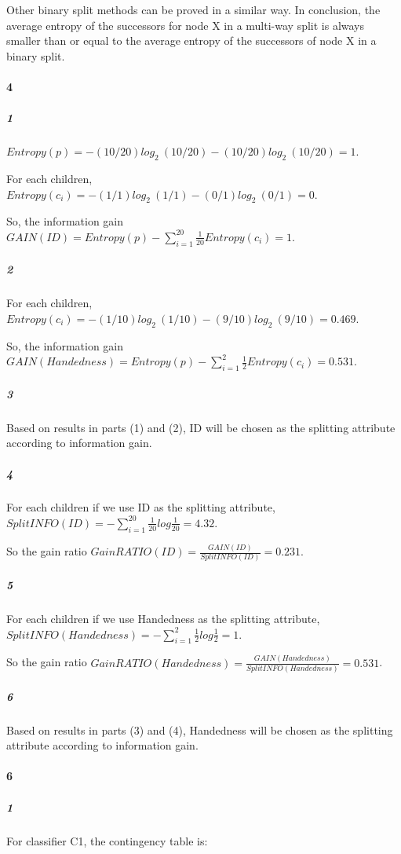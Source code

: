 \documentclass[22pt]{article}
\begin{document}
		Other binary split methods can be proved in a similar way. In conclusion,  the average entropy of the successors for node X in a multi-way split is always smaller than or equal to the average entropy of the successors of node X in a binary split. 

	\paragraph{4}
		\subparagraph{1} $Entropy(p) = - (10/20)log_2\ (10/20) -  (10/20)log_2\ (10/20) = 1$.

		For each children, $Entropy(c_i) = - (1/1)log_2\ (1/1) - (0/1)log_2\ (0/1) = 0$.

		So, the information gain $GAIN(ID) = Entropy(p) - \sum\limits_{i=1}^ {20}\frac{1}{20}Entropy(c_i) = 1$.

		\subparagraph{2}For each children, $Entropy(c_i) = - (1/10)log_2\ (1/10) - (9/10)log_2\ (9/10) = 0.469$.

		So, the information gain $GAIN(Handedness) = Entropy(p) - \sum\limits_{i=1}^ {2}\frac{1}{2}Entropy(c_i) = 0.531$.

		\subparagraph{3} Based on results in parts (1) and (2), ID will be chosen as the splitting attribute according to information gain.

		\subparagraph{4} For each children if we use ID as the splitting attribute, $SplitINFO(ID) =- \sum\limits_{i=1}^{20}\frac{1}{20}log{\frac{1}{20}} =4.32 $. 

		So the gain ratio $GainRATIO(ID) = \frac{GAIN(ID)}{SplitINFO(ID)} = 0.231$.

		\subparagraph{5}For each children if we use Handedness as the splitting attribute, $SplitINFO(Handedness) =- \sum\limits_{i=1}^{2}\frac{1}{2}log{\frac{1}{2}} =1 $.

		So the gain ratio $GainRATIO(Handedness) = \frac{GAIN(Handedness)}{SplitINFO(Handedness)} = 0.531$. 

		\subparagraph{6} Based on results in parts (3) and (4), Handedness will be chosen as the splitting attribute according to information gain.

	\paragraph{6}
	\subparagraph{1}For classifier C1, the contingency table is: \\
\end{document}
